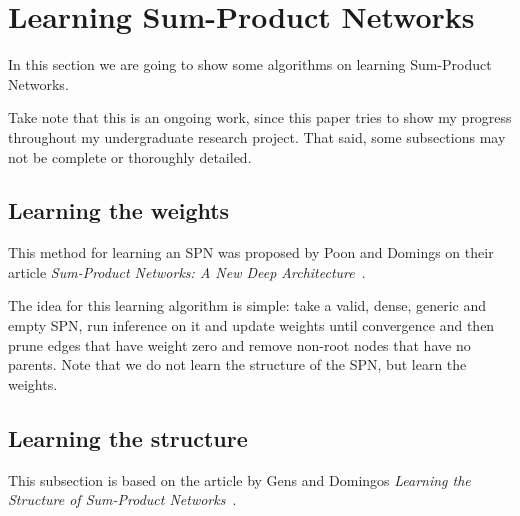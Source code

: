 \documentclass[a4paper,10pt]{article}
\theoremstyle{plain}
\begin{document}
\newpage

\section{Learning Sum-Product Networks}

In this section we are going to show some algorithms on learning Sum-Product Networks.

Take note that this is an ongoing work, since this paper tries to show my progress throughout my
undergraduate research project. That said, some subsections may not be complete or thoroughly
detailed.

\subsection{Learning the weights}

This method for learning an SPN was proposed by Poon and Domings on their article
\textit{Sum-Product Networks: A New Deep Architecture}~\cite{poon-domingos}.

The idea for this learning algorithm is simple: take a valid, dense, generic and empty SPN, run
inference on it and update weights until convergence and then prune edges that have weight zero and
remove non-root nodes that have no parents. Note that we do not learn the structure of the SPN, but
learn the weights.

\subsection{Learning the structure}

This subsection is based on the article by Gens and Domingos \textit{Learning the Structure of
Sum-Product Networks}~\cite{gens-domingos}.
\end{document}
